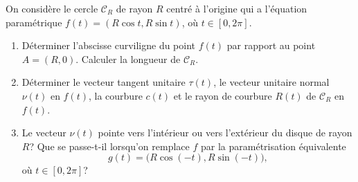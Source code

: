 \begin{exercice}\label{exoCourbesSurfaces0008}

On considère le cercle ${\mathcal{C}}_R$  de rayon $R$ centré à l'origine qui a l'équation paramétrique $f(t)   = (R \cos t, R \sin t) $, où $ t \in [0, 2 \pi]$.  

\begin{enumerate}
	\item
Déterminer l'abscisse curviligne du point $f(t)$ par rapport au point $A = (R, 0)$. Calculer la longueur de ${\mathcal{C}}_R$.
\item

Déterminer  le vecteur tangent unitaire $ {\tau}(t)$,  le vecteur unitaire normal $\nu(t)$ en $f(t)$, la courbure $c(t)$ et le rayon de courbure $R(t)$ de ${\mathcal{C}}_R$ en $f(t)$.

\item

	Le vecteur $\nu(t)$  pointe vers l'intérieur ou vers l'extérieur du disque de rayon $R$?  Que se passe-t-il lorsqu'on remplace $f$ par la paramétrisation équivalente 
	\begin{equation}
		g(t)   = \big(R \cos (-t), R \sin (-t)\big),
	\end{equation}
	où $t \in [0, 2 \pi]$?
		
\end{enumerate}

\end{exercice}
